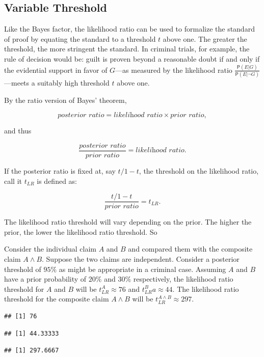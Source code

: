 \documentclass[10pt,dvipsnames,enabledeprecatedfontcommands]{scrartcl}
\newcommand{\pr}[1]{\mathsf{P}(#1)}
\begin{document}
\hypertarget{variable-threshold-1}{%
\subsection{Variable Threshold}\label{variable-threshold-1}}

Like the Bayes factor, the likelihood ratio can be used to formalize the
standard of proof by equating the standard to a threshold \(t\) above
one. The greater the threshold, the more stringent the standard. In
criminal trials, for example, the rule of decision would be: guilt is
proven beyond a reasonable doubt if and only if the evidential support
in favor of \(G\)---as measured by the likelihood ratio
\(\frac{\pr{E \vert G}}{\pr{E \vert \neg G}}\)---meets a suitably high
threshold \(t\) above one.

By the ratio version of Bayes' theorem,

\[\textit{posterior ratio} = \textit{likelihood ratio} \times \textit{prior ratio},\]

and thus

\[\frac{\textit{posterior ratio}}{\textit{prior ratio}} = \textit{likelihood ratio}.\]

If the posterior ratio is fixed at, say \(t/1-t\), the threshold on the
likelihood ratio, call it \(t_{LR}\) is defined as:

\[\frac{t/1-t}{\textit{prior ratio}} = t_{LR}.\]

\noindent The likelihood ratio threshold will vary depending on the
prior. The higher the prior, the lower the likelihood ratio threshold.
So

Consider the individual claim \(A\) and \(B\) and compared them with the
composite claim \(A \wedge B\). Suppose the two claims are independent.
Consider a posterior threshold of \(95\%\) as might be appropriate in a
criminal case. Assuming \(A\) and \(B\) have a prior probability of
\(20\%\) and \(30\%\) respectively, the likelihood ratio threshold for
\(A\) and \(B\) will be \(t_{LR}^{A}\approx 76\) and
\(t_{LR}^{B}a\approx 44\). The likelihood ratio threshold for the
composite claim \(A \wedge B\) will be
\(t^{A\wedge B}_{LR}\approx 297\).

\begin{verbatim}
## [1] 76
\end{verbatim}

\begin{verbatim}
## [1] 44.33333
\end{verbatim}

\begin{verbatim}
## [1] 297.6667
\end{verbatim}
\end{document}
